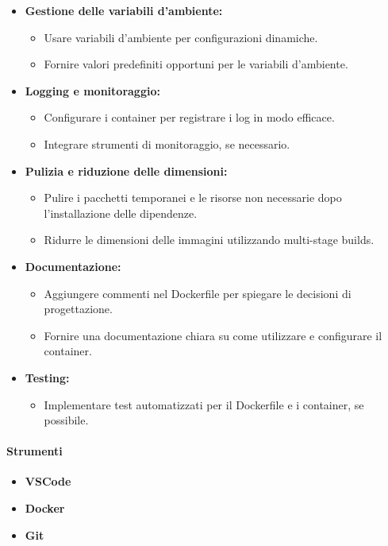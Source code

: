 \begin{itemize}
\item \textbf{Gestione delle variabili d'ambiente:}
    \begin{itemize}
        \item Usare variabili d'ambiente per configurazioni dinamiche.
        \item Fornire valori predefiniti opportuni per le variabili d'ambiente.
    \end{itemize}

\item \textbf{Logging e monitoraggio:}
    \begin{itemize}
        \item Configurare i container per registrare i log in modo efficace.
        \item Integrare strumenti di monitoraggio, se necessario.
    \end{itemize}

\item \textbf{Pulizia e riduzione delle dimensioni:}
    \begin{itemize}
        \item Pulire i pacchetti temporanei e le risorse non necessarie dopo l'installazione delle dipendenze.
        \item Ridurre le dimensioni delle immagini utilizzando multi-stage builds.
    \end{itemize}

\item \textbf{Documentazione:}
    \begin{itemize}
        \item Aggiungere commenti nel Dockerfile per spiegare le decisioni di progettazione.
        \item Fornire una documentazione chiara su come utilizzare e configurare il container.
    \end{itemize}

\item \textbf{Testing:}
    \begin{itemize}
        \item Implementare test automatizzati per il Dockerfile e i container, se possibile.
    \end{itemize}
\end{itemize}
\paragraph{Strumenti}
\begin{itemize}
    \item \textbf{VSCode}
    \item \textbf{Docker}
    \item \textbf{Git}
\end{itemize}
